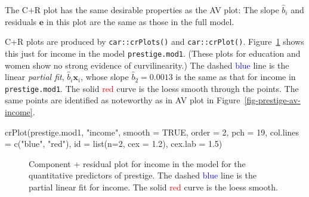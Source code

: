 \documentclass[
  letterpaper,
  10pt,
  krantz2]{krantz}
\makeatletter
\newenvironment{Shaded}{\begin{snugshade}}{\end{snugshade}}
\newcommand{\AttributeTok}[1]{\textcolor[rgb]{0.40,0.45,0.13}{#1}}
\newcommand{\ConstantTok}[1]{\textcolor[rgb]{0.56,0.35,0.01}{#1}}
\newcommand{\DecValTok}[1]{\textcolor[rgb]{0.68,0.00,0.00}{#1}}
\newcommand{\FloatTok}[1]{\textcolor[rgb]{0.68,0.00,0.00}{#1}}
\newcommand{\FunctionTok}[1]{\textcolor[rgb]{0.28,0.35,0.67}{#1}}
\newcommand{\NormalTok}[1]{\textcolor[rgb]{0.00,0.23,0.31}{#1}}
\newcommand{\StringTok}[1]{\textcolor[rgb]{0.13,0.47,0.30}{#1}}
\newenvironment{kframe}{%
  \medskip{}
  \setlength{\fboxsep}{.8em}
  \def\at@end@of@kframe{}%
  \ifinner\ifhmode%
  \def\at@end@of@kframe{\end{minipage}}%
  \begin{minipage}{\columnwidth}%
  \fi\fi%
  \def\FrameCommand##1{\hskip\@totalleftmargin \hskip-\fboxsep
  \colorbox{shadecolor}{##1}\hskip-\fboxsep
      \hskip-\linewidth \hskip-\@totalleftmargin \hskip\columnwidth}%
  \MakeFramed {\advance\hsize-\width
    \@totalleftmargin\z@ \linewidth\hsize
    \@setminipage}}%
{\par\unskip\endMakeFramed%
  \at@end@of@kframe}
\renewenvironment{Shaded}{\begin{kframe}}{\end{kframe}}
\makeatother
\begin{document}
The C+R plot has the same desirable properties as the AV plot: The slope
\(\hat{b}_i\) and residuals \(\mathbf{e}\) in this plot are the same as
those in the full model.

C+R plots are produced by \texttt{car::crPlots()} and
\texttt{car::crPlot()}. Figure~\ref{fig-prestige-crplot} shows this just
for income in the model \texttt{prestige.mod1}. (These plots for
education and women show no strong evidence of curvilinearity.) The
dashed \textcolor{blue}{blue} line is the linear \emph{partial fit},
\(\hat{b}_i \mathbf{x}_i\), whose slope \(\hat{b}_2 = 0.0013\) is the
same as that for income in \texttt{prestige.mod1}. The solid
\textcolor{red}{red} curve is the loess smooth through the points. The
same points are identified as noteworthy as in AV plot in
Figure~\ref{fig-prestige-av-income}.

\begin{Shaded}
\begin{Highlighting}[]
\FunctionTok{crPlot}\NormalTok{(prestige.mod1, }\StringTok{"income"}\NormalTok{,}
       \AttributeTok{smooth =} \ConstantTok{TRUE}\NormalTok{,}
       \AttributeTok{order =} \DecValTok{2}\NormalTok{,}
       \AttributeTok{pch =} \DecValTok{19}\NormalTok{,}
       \AttributeTok{col.lines =} \FunctionTok{c}\NormalTok{(}\StringTok{"blue"}\NormalTok{, }\StringTok{"red"}\NormalTok{),}
       \AttributeTok{id =} \FunctionTok{list}\NormalTok{(}\AttributeTok{n=}\DecValTok{2}\NormalTok{, }\AttributeTok{cex =} \FloatTok{1.2}\NormalTok{),}
       \AttributeTok{cex.lab =} \FloatTok{1.5}\NormalTok{) }
\end{Highlighting}
\end{Shaded}

\begin{figure}[H]


\caption{\label{fig-prestige-crplot}Component + residual plot for income
in the model for the quantitative predictors of prestige. The dashed
\textcolor{blue}{blue} line is the partial linear fit for income. The
solid \textcolor{red}{red} curve is the loess smooth.}

\end{figure}%
\end{document}
